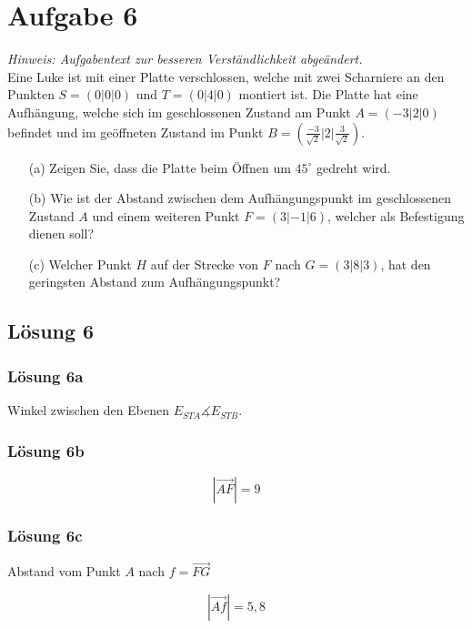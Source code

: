 \documentclass[main.tex]{subfiles}
\begin{document}
\section{Aufgabe 6}
\textit{Hinweis: Aufgabentext zur besseren Verständlichkeit abgeändert.}\\

Eine Luke ist mit einer Platte verschlossen, welche mit zwei Scharniere an den Punkten $S = (0|0|0)$ und $T = (0|4|0)$ montiert ist.
Die Platte hat eine Aufhängung, welche sich im geschlossenen Zustand am Punkt $A = (-3|2|0)$ befindet und im geöffneten Zustand im Punkt $B = (\frac{-3}{\sqrt{2}}|2|\frac{3}{\sqrt{2}})$.

\begin{enumerate}
    \item[(a)] Zeigen Sie, dass die Platte beim Öffnen um $45^{\circ}$ gedreht wird.
    \item[(b)] Wie ist der Abstand zwischen dem Aufhängungspunkt im geschlossenen Zustand $A$ und einem weiteren Punkt $F = (3|-1|6)$, welcher als Befestigung dienen soll?
    \item[(c)] Welcher Punkt $H$ auf der Strecke von $F$ nach $G = (3|8|3)$, hat den geringsten Abstand zum Aufhängungspunkt?
\end{enumerate}

\subsection{Lösung 6}

\subsubsection{Lösung 6a}
Winkel zwischen den Ebenen $E_{STA}\measuredangle E_{STB}$.

\subsubsection{Lösung 6b}
\begin{equation*}
    \left| \vec{AF} \right| = 9
\end{equation*}

\subsubsection{Lösung 6c}
Abstand vom Punkt $A$ nach $f = \vec{FG}$

\begin{equation*}
    \left| \vec{Af} \right| = 5,8
\end{equation*}
\end{document}
